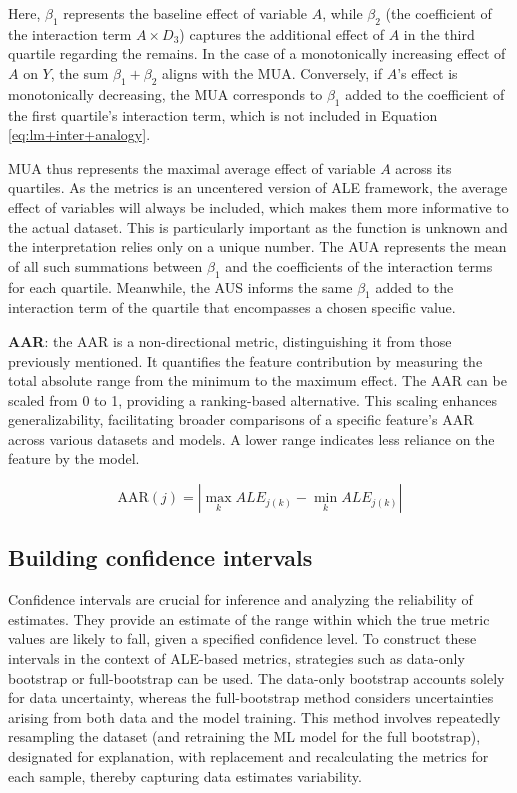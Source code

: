 Here, \(\beta_1\) represents the baseline effect of variable \(A\), while \(\beta_2\) (the coefficient of the interaction term \(A \times D_3\)) captures the additional effect of \(A\) in the third quartile regarding the remains. In the case of a monotonically increasing effect of \(A\) on \(Y\), the sum \(\beta_1 + \beta_2\) aligns with the \gls{MUA}. Conversely, if \(A\)'s effect is monotonically decreasing, the \gls{MUA} corresponds to \(\beta_1\) added to the coefficient of the first quartile's interaction term, which is not included in Equation \ref{eq:lm+inter+analogy}.

\gls{MUA} thus represents the maximal average effect of variable \(A\) across its quartiles. As the metrics is an uncentered version of \gls{ALE} framework, the average effect of variables will always be included, which makes them more informative to the actual dataset. This is particularly important as the function is unknown and the interpretation relies only on a unique number. The \gls{AUA} represents the mean of all such summations between \(\beta_1\) and the coefficients of the interaction terms for each quartile. Meanwhile, the \gls{AUS} informs the same \(\beta_1\) added to the interaction term of the quartile that encompasses a chosen specific value. 

\textbf{\gls{AAR}}: the \gls{AAR} is a non-directional metric, distinguishing it from those previously mentioned. It quantifies the feature contribution by measuring the total absolute range from the minimum to the maximum effect. The \gls{AAR} can be scaled from 0 to 1, providing a ranking-based alternative. This scaling enhances generalizability, facilitating broader comparisons of a specific feature's \gls{AAR} across various datasets and models. A lower range indicates less reliance on the feature by the model.

\begin{equation}
\label{eq:AAR}
\text{AAR}(j) = \left| \max_{k} ALE_{j(k)} - \min_{k} ALE_{j(k)} \right|
\end{equation}

\subsection{Building confidence intervals}

Confidence intervals are crucial for inference and analyzing the reliability of estimates. They provide an estimate of the range within which the true metric values are likely to fall, given a specified confidence level. To construct these intervals in the context of \gls{ALE}-based metrics, strategies such as data-only bootstrap or full-bootstrap can be used. The data-only bootstrap accounts solely for data uncertainty, whereas the full-bootstrap method considers uncertainties arising from both data and the model training. This method involves repeatedly resampling the dataset (and retraining the \gls{ML} model for the full bootstrap), designated for explanation, with replacement and recalculating the metrics for each sample, thereby capturing data estimates variability.

